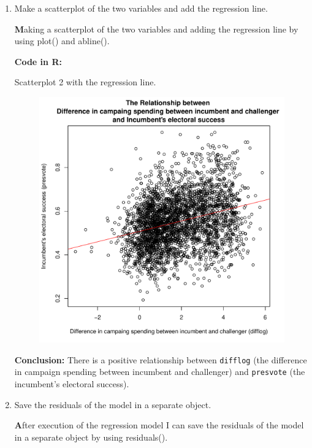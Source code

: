 \documentclass[12pt,letterpaper]{article}
\begin{document}
\begin{enumerate}
		\item Make a scatterplot of the two variables and add the regression line. 	\vspace{0.5cm}
		
		\noindent \textbf Making a scatterplot of the two variables and adding the regression line by using plot() and abline(). \vspace{0.5cm}
		
		\noindent \textbf{Code in R:}
		  
		\vspace{0.25cm}
		

	\noindent Scatterplot 2 with the regression line.


\begin{figure}[h!]\centering
	\includegraphics[width=.75\textwidth]{scatterplot_q2.pdf}
	\end{figure}

\vspace{0.5cm}

\noindent \textbf{Conclusion:} 
There is a positive relationship between \texttt{difflog} (the difference in campaign spending between incumbent and challenger) and \texttt{presvote} (the incumbent's electoral success).
\vspace{0.5cm}
		
		
		\item Save the residuals of the model in a separate object.	\vspace{0.5cm}
		
			\noindent \textbf After execution of the regression model I can save the residuals of the model in a separate object by using residuals(). \vspace{0.5cm}
		

\end{enumerate}
\end{document}
